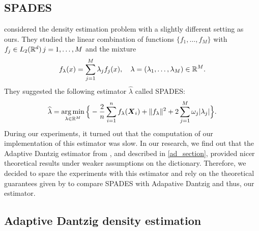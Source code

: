 \subsection{SPADES}
\citep{SPADES} considered the density estimation problem with a slightly different setting as ours. They studied the linear combination of functions $\{f_1,\dots,f_M\}$ with $f_j\in L_2({\mathbb R}^d)\, j=1,\dots,M$ and the mixture
\begin{equation}
    f_{\lambda}(x)=\sum_{j=1}^M\lambda_j f_j(x), \quad \lambda = (\lambda_1,\dots,\lambda_M)\in {\mathbb R}^M.
\end{equation}
They suggested the following estimator $\hat \lambda$ called SPADES:
\begin{equation}
    \widehat\lambda = \operatorname*{arg\,min}_{\lambda \in {\mathbb R}^M}\Big\{-\frac{2}{n}\sum_{i=1}^n f_{\lambda}(\boldsymbol X_i) +\|f_{\lambda}\|^2 +2\sum_{j=1}^M\omega_j|\lambda_j|\Big\}.
\end{equation}
During our experiments, it turned out that the computation of our implementation of this estimator was slow. In our research, we find out that the Adaptive Dantzig estimator from \citep{Bertin}, and described in \cref{ad_section}, provided nicer theoretical results under weaker assumptions on the dictionary. Therefore, we decided to spare the experiments with this estimator and rely on the theoretical guarantees given by \citep{Bertin} to compare SPADES with Adapative Dantzig and thus, our estimator.

\subsection{Adaptive Dantzig density estimation\label{ad_section}}


